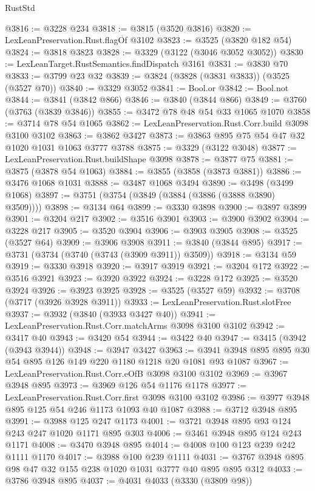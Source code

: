 \begin{lexlean}{RustStd}
\begin{coremodule}
{\begin{coremodule}
{{{{{{{{{{{{{{{{{{{{{{{{{{@3816 := @3228 @234
@3818 := @3815 (@3520 @3816)
@3820 := LexLeanPreservation.Rust.flagOf @3102
@3823 := @3525 (@3820 @182 @54)
@3824 := @3818 @3823
@3828 := @3329 (@3122 (@3046 @3052 @3052))
@3830 := LexLeanTarget.RustSemantics.findDispatch @3161
@3831 := @3830 @70
@3833 := @3799 @23 @32
@3839 := @3824 (@3828 (@3831 @3833)) (@3525 (@3527 @70))
@3840 := @3329 @3052
@3841 := Bool.or
@3842 := Bool.not
@3844 := @3841 (@3842 @866)
@3846 := @3840 (@3844 @866)
@3849 := @3760 (@3763 (@3839 @3846))
@3855 := @3472 @78 @48 @54 @33 @1065 @1070
@3858 := @3714 @78 @54 @1065
@3862 := LexLeanPreservation.Rust.Corr.build @3098 @3100 @3102
@3863 := @3862 @3427
@3873 := @3863 @895 @75 @54 @47 @32 @1020 @1031 @1063 @3777 @3788
@3875 := @3329 (@3122 @3048)
@3877 := LexLeanPreservation.Rust.buildShape @3098
@3878 := @3877 @75
@3881 := @3875 (@3878 @54 @1063)
@3884 := @3855 (@3858 (@3873 @3881))
@3886 := @3476 @1068 @1031
@3888 := @3487 @1068 @3494
@3890 := @3498 (@3499 @1068)
@3897 := @3751 (@3754 (@3849 (@3884 (@3886 (@3888 @3890) @3509))))
@3898 := @3134 @64
@3899 := @3330 @3898
@3900 := @3897 @3899
@3901 := @3204 @217
@3902 := @3516 @3901
@3903 := @3900 @3902
@3904 := @3228 @217
@3905 := @3520 @3904
@3906 := @3903 @3905
@3908 := @3525 (@3527 @64)
@3909 := @3906 @3908
@3911 := @3840 (@3844 @895)
@3917 := @3731 (@3734 (@3740 (@3743 (@3909 @3911)) @3509))
@3918 := @3134 @59
@3919 := @3330 @3918
@3920 := @3917 @3919
@3921 := @3204 @172
@3922 := @3516 @3921
@3923 := @3920 @3922
@3924 := @3228 @172
@3925 := @3520 @3924
@3926 := @3923 @3925
@3928 := @3525 (@3527 @59)
@3932 := @3708 (@3717 (@3926 @3928 @3911))
@3933 := LexLeanPreservation.Rust.slotFree
@3937 := @3932 (@3840 (@3933 @3427 @40))
@3941 := LexLeanPreservation.Rust.Corr.matchArms @3098 @3100 @3102
@3942 := @3417 @40
@3943 := @3420 @54
@3944 := @3422 @40
@3947 := @3415 (@3942 (@3943 @3944))
@3948 := @3947 @3427
@3963 := @3941 @3948 @895 @895 @30 @54 @895 @126 @149 @220 @1180 @1218 @20 @1081 @93 @1087
@3967 := LexLeanPreservation.Rust.Corr.eOfB @3098 @3100 @3102
@3969 := @3967 @3948 @895
@3973 := @3969 @126 @54 @1176 @1178
@3977 := LexLeanPreservation.Rust.Corr.first @3098 @3100 @3102
@3986 := @3977 @3948 @895 @125 @54 @246 @1173 @1093 @40 @1087
@3988 := @3712 @3948 @895
@3991 := @3988 @125 @247 @1173
@4001 := @3721 @3948 @895 @93 @124 @243 @247 @1020 @1171 @895 @303
@4006 := @3461 @3948 @895 @124 @243 @1171
@4008 := @3470 @3948 @895
@4014 := @4008 @100 @123 @239 @242 @1111 @1170
@4017 := @3988 @100 @239 @1111
@4031 := @3767 @3948 @895 @98 @47 @32 @155 @238 @1020 @1031 @3777 @40 @895 @895 @312
@4033 := @3786 @3948 @895
@4037 := @4031 @4033 (@3330 (@3809 @98))
}}}}}}}}}}}}}}}}}}}}}}}}}}
\end{coremodule}}
\end{coremodule}
\end{lexlean}
